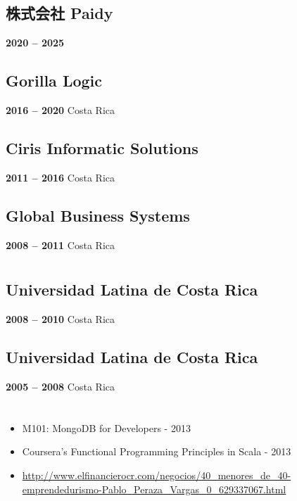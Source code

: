 \documentclass[a4paper,10pt]{article}
\begin{document}
\subsection*{株式会社 Paidy}
\textbf{2020 -- 2025} \hfill  \japan \\
\emph{\softDevSeniorScala}
\paidyText

\subsection*{Gorilla Logic}
\textbf{2016 -- 2020} \hfill  Costa Rica \\
\emph{\gorillaTitle}
\gorillaText

\subsection*{Ciris Informatic Solutions}
\textbf{2011 -- 2016} \hfill  Costa Rica \\
\emph{\cirisTitle}
\cirisText

\subsection*{Global Business Systems}
\textbf{2008 -- 2011} \hfill  Costa Rica \\
\emph{\gbsysTitle}
\gbsysText

\section*{\textcolor{primary}{\educacion}}
\subsection*{Universidad Latina de Costa Rica}
\textbf{2008 -- 2010} \hfill  Costa Rica \\
\emph{\licenciaturaTitle}
\licenciaturaText

\subsection*{Universidad Latina de Costa Rica}
\textbf{2005 -- 2008} \hfill  Costa Rica \\
\emph{\bachilleratorTitle}
\bachilleratorText

\section*{\textcolor{primary}{\desarrolloProfesional}}
\begin{itemize}
    \item M101: MongoDB for Developers - 2013
    \item Coursera’s Functional Programming Principles in Scala - 2013
    \item \elfinanciero
    \url{http://www.elfinancierocr.com/negocios/40_menores_de_40-emprendedurismo-Pablo_Peraza_Vargas_0_629337067.html}
\end{itemize}
\end{document}
